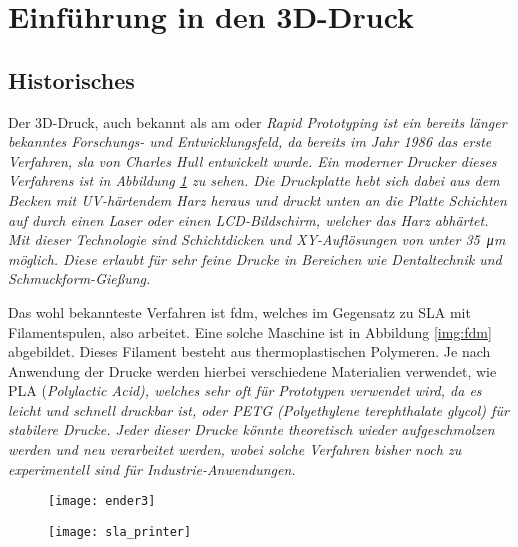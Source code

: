 \documentclass[../main.tex]{subfiles}
\begin{document}
\section{Einführung in den 3D-Druck}
\subsection{Historisches}
Der 3D-Druck, auch bekannt als \acrfull{am} oder \it{Rapid Prototyping} ist ein bereits länger bekanntes Forschungs- und Entwicklungsfeld, da bereits im Jahr 1986 das erste Verfahren, \acrfull{sla} von Charles Hull entwickelt wurde.
Ein moderner Drucker dieses Verfahrens ist in Abbildung \ref{img:sla} zu sehen. 
Die Druckplatte hebt sich dabei aus dem Becken mit UV-härtendem Harz heraus und druckt unten an die Platte Schichten auf durch einen Laser oder einen LCD-Bildschirm, welcher das Harz abhärtet. 
Mit dieser Technologie sind Schichtdicken und XY-Auflösungen von unter \qty{35}{\micro\meter} möglich. Diese erlaubt für sehr feine Drucke in Bereichen wie Dentaltechnik und Schmuckform-Gießung. \parencite{FORMLABS_1}

Das wohl bekannteste Verfahren ist \acrfull{fdm}, welches im Gegensatz zu SLA mit Filamentspulen, also  arbeitet. Eine solche Maschine ist in  Abbildung \ref{img:fdm} abgebildet.
Dieses Filament besteht aus thermoplastischen Polymeren. Je nach Anwendung der Drucke werden hierbei verschiedene Materialien verwendet, wie PLA (\it{Polylactic Acid}), welches sehr oft für Prototypen verwendet wird, da es leicht und schnell druckbar ist, oder PETG (\it{Polyethylene terephthalate glycol}) für stabilere Drucke. 
Jeder dieser Drucke könnte theoretisch wieder aufgeschmolzen werden und neu verarbeitet werden, wobei solche Verfahren bisher noch zu experimentell sind für Industrie-Anwendungen. \parencite{OLADAPO2023165046}  

\begin{figure}[h]
\centering
\begin{minipage}{.5\textwidth}
  \centering
  \texttt{[image: ender3]}
  \label{img:fdm}
\end{minipage}%
\begin{minipage}{.5\textwidth}
  \centering
  \texttt{[image: sla\_printer]}
  \label{img:sla}
\end{minipage}
\end{figure}
\end{document}
